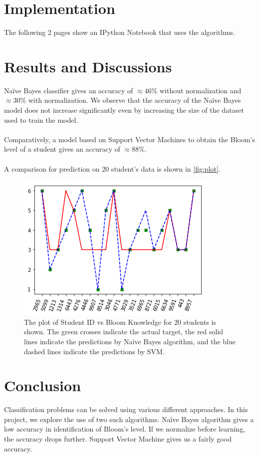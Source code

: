 \documentclass[12pt,oneside,a4paper]{article}
\begin{document}
		
		\section{Implementation}
			The following 2 pages show an IPython Notebook that uses the algorithms.
			
		
		\section{Results and Discussions}
		
		Na\"ive Bayes classifier gives an accuracy of $\approx 46\%$ without normalization and $\approx 30\%$ with normalization. We observe that the accuracy of the Na\"ive Bayes model does not increase significantly even by increasing the size of the dataset used to train the model. \\
		\\
		Comparatively, a model based on Support Vector Machines to obtain the Bloom's level of a student gives an accuracy of $\approx 88\%$. \\
		\\
		A comparison for prediction on 20 student's data is shown in \autoref{fig:plot}.
		
		\begin{figure}[htp]
			\centering
			\includegraphics[scale=0.7]{BloomLevelPredictor.png}
			\caption{\small{The plot of Student ID vs Bloom Knowledge for 20 students is shown. The green crosses indicate the actual target, the red solid lines indicate the predictions by Na\"ive Bayes algorithm, and the blue dashed lines indicate the predictions by SVM.}}
			\label{fig:plot}
		\end{figure}

		\section{Conclusion}
			Classification problems can be solved using various different approaches. In this project, we explore the use of two such algorithms. Na\"ive Bayes algorithm gives a low accuracy in identification of Bloom's level. If we normalize before learning, the accuracy drops further. Support Vector Machine gives us a fairly good accuracy.

	\newpage
	
	{}
\end{document}
